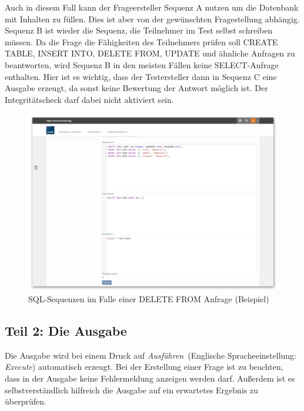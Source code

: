         Auch in diesem Fall kann der Frageersteller Sequenz A nutzen um die Datenbank mit Inhalten zu füllen. Dies ist aber von der gewünschten Fragestellung abhängig. Sequenz B ist wieder die Sequenz, die Teilnehmer im Test selbst schreiben müssen. Da die Frage die Fähigkeiten des Teilnehmers prüfen soll CREATE TABLE, INSERT INTO, DELETE FROM, UPDATE und ähnliche Anfragen zu beantworten, wird Sequenz B in den meisten Fällen keine SELECT-Anfrage enthalten. Hier ist es wichtig, dass der Testersteller dann in Sequenz C eine Ausgabe erzeugt, da sonst keine Bewertung der Antwort möglich ist. Der Integritätscheck darf dabei nicht aktiviert sein.
        
        \begin{figure}[H]
            \begin{center}
                \includegraphics[page=1, width=0.7\paperwidth, trim=4 4 4 4, clip]{fig/Beispiel-SQL-Sequenzen-bei-DELETE-FROM-Anfrage.png} 
                \caption{SQL-Sequenzen im Falle einer DELETE FROM Anfrage (Beispiel)}
                \label{fig:beispiel-sql-sequenzen-bei-delete-from-anfrage}
            \end{center}
        \end{figure}
        
\subsection{Teil 2: Die Ausgabe}
            
        Die Ausgabe wird bei einem Druck auf \glqq\textit{Ausführen}\grqq\ (Englische Spracheeinstellung: \glqq\textit{Execute}\grqq ) automatisch erzeugt. Bei der Erstellung einer Frage ist zu beachten, dass in der Ausgabe keine Fehlermeldung anzeigen werden darf. Außerdem ist es selbstverständlich hilfreich die Ausgabe auf ein erwartetes Ergebnis zu überprüfen.
        
